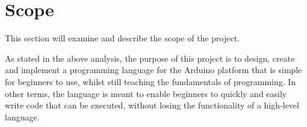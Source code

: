 \section{Scope}
This section will examine and describe the scope of the project. %

As stated in the above analysis, the purpose of this project is to design, create and implement a
programming language for the Arduino platform that is simple for beginners to use, whilst still teaching the
fundamentals of programming.
In other terms, the language is meant to enable beginners to quickly and easily write
code that can be executed, without losing the functionality of a high-level language.
 
